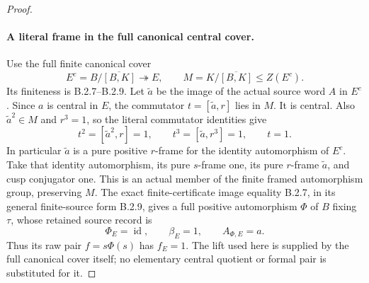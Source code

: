 \begin{proof}
\paragraph{A literal frame in the full canonical central cover.}
Use the full finite canonical cover
\[
 E^c=B/\overline{[B,K]}\twoheadrightarrow E,\qquad
 M=K/\overline{[B,K]}\leq Z(E^c).
                                                               \tag{OGS.13}
\]
Its finiteness is B.2.7--B.2.9.
Let $\widetilde a$ be the image of the actual source
word $A$ in $E^c$.
Since $a$ is central in $E$, the commutator
$t=[\widetilde a,r]$ lies in $M$.
It is central.  Also $\widetilde a^2\in M$ and
$r^3=1$, so the literal commutator identities give
\[
       t^2=[\widetilde a^2,r]=1,\qquad
       t^3=[\widetilde a,r^3]=1,\qquad t=1.
                                                               \tag{OGS.14}
\]
In particular $\widetilde a$ is a pure positive
$r$-frame for the identity automorphism of $E^c$.
Take that identity automorphism, its pure $s$-frame
one, its pure $r$-frame $\widetilde a$, and cusp
conjugator one.
This is an actual member of the finite framed
automorphism group, preserving $M$.
The exact finite-certificate image equality
B.2.7, in its general finite-source form B.2.9,
gives a full positive automorphism $\Phi$ of $B$
fixing $\tau$, whose retained source record is
\[
        \Phi_E=\operatorname{id},\qquad
        \beta_E=1,\qquad A_{\Phi,E}=a .
                                                               \tag{OGS.15}
\]
Thus its raw pair $f=s\Phi(s)$ has $f_E=1$.
The lift used here is supplied by the full canonical
cover itself; no elementary central quotient or
formal pair is substituted for it.


\end{proof}
